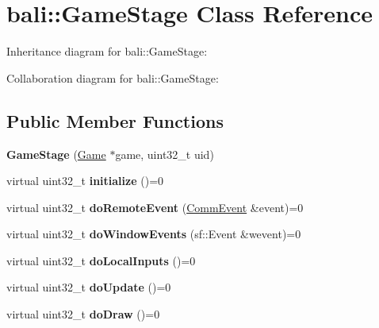 \hypertarget{classbali_1_1_game_stage}{\section{bali\-:\-:Game\-Stage Class Reference}
\label{classbali_1_1_game_stage}
}


Inheritance diagram for bali\-:\-:Game\-Stage\-:


Collaboration diagram for bali\-:\-:Game\-Stage\-:
\subsection*{Public Member Functions}
\begin{DoxyCompactItemize}
\item 
\hypertarget{classbali_1_1_game_stage_ae314bc6c984bc4e581c9d3ac86d0197f}{{\bfseries Game\-Stage} (\hyperlink{classbali_1_1_game}{Game} $\ast$game, uint32\-\_\-t uid)}\label{classbali_1_1_game_stage_ae314bc6c984bc4e581c9d3ac86d0197f}

\item 
\hypertarget{classbali_1_1_game_stage_a3867cd9caf5d03890894da86d4650999}{virtual uint32\-\_\-t {\bfseries initialize} ()=0}\label{classbali_1_1_game_stage_a3867cd9caf5d03890894da86d4650999}

\item 
\hypertarget{classbali_1_1_game_stage_ae87ddbe3c24a0a212eb2b967246f8e7d}{virtual uint32\-\_\-t {\bfseries do\-Remote\-Event} (\hyperlink{classbali_1_1_comm_event}{Comm\-Event} \&event)=0}\label{classbali_1_1_game_stage_ae87ddbe3c24a0a212eb2b967246f8e7d}

\item 
\hypertarget{classbali_1_1_game_stage_a83073e9d9265c75a2d0c9fcf72de6718}{virtual uint32\-\_\-t {\bfseries do\-Window\-Events} (sf\-::\-Event \&wevent)=0}\label{classbali_1_1_game_stage_a83073e9d9265c75a2d0c9fcf72de6718}

\item 
\hypertarget{classbali_1_1_game_stage_a56c6cf7954eefa7f7c1486e44593faad}{virtual uint32\-\_\-t {\bfseries do\-Local\-Inputs} ()=0}\label{classbali_1_1_game_stage_a56c6cf7954eefa7f7c1486e44593faad}

\item 
\hypertarget{classbali_1_1_game_stage_a8a38735164ef454cf3b979ceb52141d5}{virtual uint32\-\_\-t {\bfseries do\-Update} ()=0}\label{classbali_1_1_game_stage_a8a38735164ef454cf3b979ceb52141d5}

\item 
\hypertarget{classbali_1_1_game_stage_ab48792032e9b13a312ac31e8af75fc0f}{virtual uint32\-\_\-t {\bfseries do\-Draw} ()=0}\label{classbali_1_1_game_stage_ab48792032e9b13a312ac31e8af75fc0f}


\end{DoxyCompactItemize}
